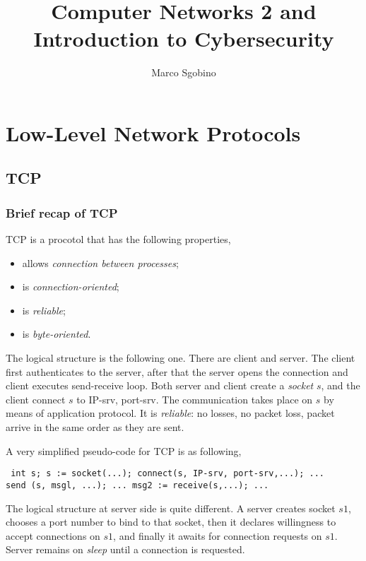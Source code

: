 \documentclass[a4paper, 12pt]{report}
\begin{document}
\title{Computer Networks 2 and Introduction to Cybersecurity}
\author{Marco Sgobino}
\maketitle
\tableofcontents

\part{Low-Level Network Protocols}

\chapter{TCP}

\section{Brief recap of TCP}
TCP is a procotol that has the following properties,

\begin{itemize}
	\item allows \emph{connection between processes};
	\item is \emph{connection-oriented};
	\item is \emph{reliable};
	\item is \emph{byte-oriented}.
\end{itemize}

The logical structure is the following one. There are client and server. The
client first authenticates to the server, after that the server opens the
connection and client executes send-receive loop. Both server and client create
a \emph{socket} $s$, and the client connect $s$ to IP-srv, port-srv. The
communication takes place on $s$ by means of application protocol. It is
\emph{reliable}: no losses, no packet loss, packet arrive in the same order as
they are sent.

A very simplified pseudo-code for TCP is as following,

\begin{verbatim} int s; s := socket(...); connect(s, IP-srv, port-srv,...); ...
send (s, msgl, ...); ... msg2 := receive(s,...); ... \end{verbatim}

The logical structure at server side is quite different. A server creates
socket $s1$, chooses a port number to bind to that socket, then it declares
willingness to accept connections on $s1$, and finally it awaits for connection
requests on $s1$. Server remains on \emph{sleep} until a connection is
requested.
\end{document}
